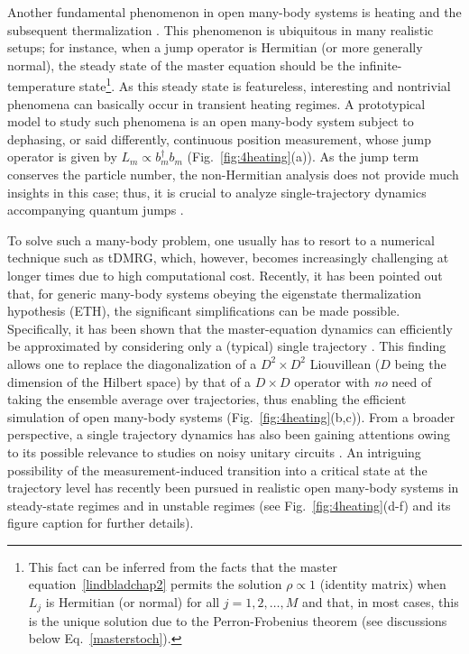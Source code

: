 \documentclass{tADP2e}
\theoremstyle{plain}
\theoremstyle{plain}
\theoremstyle{definition}
\begin{document}
Another fundamental phenomenon in open many-body systems is  heating and the subsequent thermalization \cite{LDA16,GF10,PH10,SJ14,YA18therm,ST20,BA20}. This phenomenon is  ubiquitous in many realistic setups; for instance, when a jump operator is Hermitian (or more generally normal), the steady state of the master equation should be the infinite-temperature state\footnote{This fact can be inferred from the facts that the master equation~\eqref{lindbladchap2} permits the solution $\rho\propto 1$ (identity matrix) when $L_j$ is Hermitian (or normal) for all $j=1,2,\ldots,M$ and that, in most cases, this is the unique solution due to the Perron-Frobenius theorem (see discussions below Eq.~\eqref{masterstoch}).}. As this steady state is featureless, interesting and nontrivial phenomena can basically occur in transient heating regimes.  A prototypical model to study such phenomena is an open many-body system subject to dephasing, or said differently, continuous position measurement, whose jump operator is given by $L_m\propto b^\dagger_m b_m$ (Fig.~\ref{fig:4heating}(a)). As the jump term conserves the particle number, the non-Hermitian analysis does not provide much insights in this case; thus, it is crucial to analyze single-trajectory dynamics accompanying quantum jumps \cite{PH10,SJ14,YA18therm}. 

To solve such a many-body problem,  one usually has to resort to a numerical technique such as tDMRG, which, however, becomes increasingly challenging at longer times due to high computational cost. Recently, it has been pointed out that, for generic many-body systems obeying the eigenstate thermalization hypothesis (ETH), the  significant simplifications can be made possible. Specifically, it has been shown that the master-equation dynamics can efficiently be approximated by considering only a (typical) single trajectory \cite{YA18therm}. This finding allows one to replace the diagonalization of a $D^2\times D^2$ Liouvillean ($D$ being the dimension of the Hilbert space) by that of a $D\times D$ operator with {\it no} need of taking the ensemble average over trajectories, thus enabling the efficient simulation of open many-body systems (Fig.~\ref{fig:4heating}(b,c)). From a broader perspective, a single trajectory dynamics has also been gaining attentions owing to its possible relevance to studies on noisy unitary circuits \cite{HP16,BL17,NA17,MK18,LY18,CA19,SB19}. An intriguing possibility of the measurement-induced transition into a critical state at the trajectory level has recently been pursued in realistic open many-body systems in steady-state regimes \cite{XC19,TQ20,YF20} and in unstable regimes \cite{GS20} (see Fig.~\ref{fig:4heating}(d-f) and its figure caption for further details).
\end{document}
